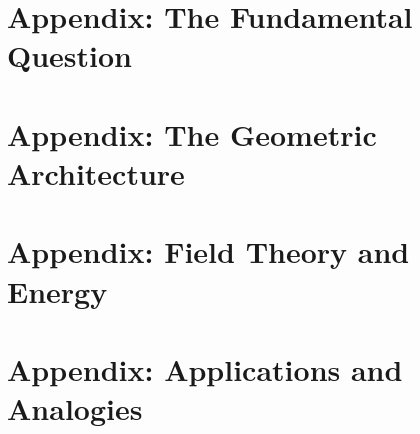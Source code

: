 \documentclass[11pt,oneside]{book}
\begin{document}






\appendix

\part{Appendix: The Fundamental Question}


\part{Appendix: The Geometric Architecture}





\part{Appendix: Field Theory and Energy}



\part{Appendix: Applications and Analogies}



\end{document}
